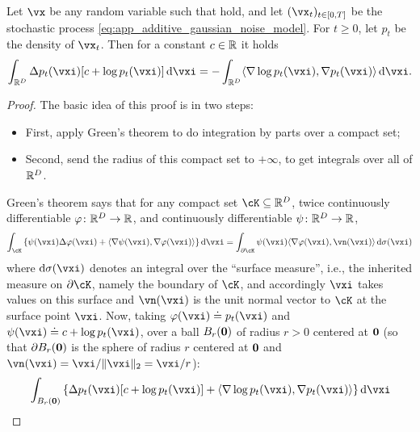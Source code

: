 \documentclass[../../book-main.tex]{subfiles}
\begin{document}
\begin{lemma}\label{lem:diffusion_ibp}
    Let \(\vx\) be any random variable such that  hold, and let \((\vx_{t})_{t \in [0, T]}\) be the stochastic process \eqref{eq:app_additive_gaussian_noise_model}. For \(t \geq 0\), let \(p_{t}\) be the density of \(\vx_{t}\). Then for a constant \(c \in \mathbb{R}\) it holds 
    \begin{equation}
        \int_{\R^{D}}\Delta p_{t}(\vxi)[c + \log p_{t}(\vxi)]\odif{\vxi} = -\int_{\R^{D}}\ip{\nabla \log p_{t}(\vxi)}{\nabla p_{t}(\vxi)}\odif{\vxi}.
    \end{equation}
\end{lemma}
\begin{proof}
    The basic idea of this proof is in two steps:
    \begin{itemize}
        \item First, apply Green's theorem to do integration by parts over a compact set;
        \item Second, send the radius of this compact set to \(+\infty\), to get integrals over all of \(\mathbb{R}^{D}\).
    \end{itemize}
    Green's theorem says that for any compact set \(\cK \subseteq \R^{D}\), twice continuously differentiable \(\plainphi \colon \R^{D} \to \R\), and continuously differentiable \(\psi \colon \mathbb{R}^{D} \to \mathbb{R}\),
    \begin{equation}
        \int_{\cK}\bc{\psi(\vxi) \Delta \plainphi(\vxi) + \ip{\nabla \psi(\vxi)}{\nabla \plainphi(\vxi)}}\odif{\vxi} = \int_{\partial \cK}\psi(\vxi)\ip{\nabla \plainphi(\vxi)}{\vn(\vxi)}\odif{\sigma(\vxi)}
    \end{equation}
    where \(\odif{\sigma(\vxi)}\) denotes an integral over the ``surface measure'', i.e., the inherited measure on \(\partial \cK\), namely the boundary of \(\cK\), and accordingly \(\vxi\) takes values on this surface and \(\vn(\vxi)\) is the unit normal vector to \(\cK\) at the surface point \(\vxi\). Now, taking \(\plainphi(\vxi) \doteq p_{t}(\vxi)\) and \(\psi(\vxi) \doteq c + \log p_{t}(\vxi)\), over a ball \(B_{r}(\bm{0})\) of radius \(r > 0\) centered at \(\bm{0}\) (so that \(\partial B_{r}(\bm{0})\) is the sphere of radius \(r\) centered at \(\bm{0}\) and \(\vn(\vxi) = \vxi/\norm{\vxi}_{2} = \vxi/r\)):
    \begin{align}
        &\int_{B_{r}(\vzero)}\bc{\Delta p_{t}(\vxi)[c + \log p_{t}(\vxi)] + \ip{\nabla \log p_{t}(\vxi)}{\nabla p_{t}(\vxi)}}\odif{\vxi} \\

\end{align}
\end{proof}
\end{document}
